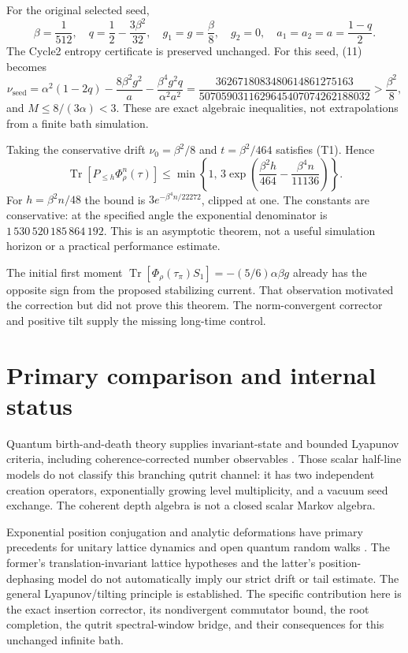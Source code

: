 \documentclass[11pt]{article}
\newcommand{\Tr}{\operatorname{Tr}}
\begin{document}
For the original selected seed,
\[
 \beta=\frac1{512},\quad
 q=\frac12-\frac{3\beta^2}{32},\quad g_1=g=\frac\beta8,\quad
 g_2=0,\quad a_1=a_2=a=\frac{1-q}{2}.
 \tag{16}
\]
The Cycle2 entropy certificate is preserved unchanged.
For this seed, (11) becomes
\[
 \nu_{\mathrm{seed}}=\alpha^2(1-2q)
 -\frac{8\beta^2g^2}{a}
 -\frac{\beta^4g^2q}{\alpha^2a^2}
 =\frac{3626718083480614861275163}
 {5070590311629645407074262188032}
 >\frac{\beta^2}{8},
 \tag{17}
\]
and $M\le8/(3\alpha)<3$. These are exact algebraic inequalities,
not extrapolations from a finite bath simulation.

Taking the conservative drift $\nu_0=\beta^2/8$ and
$t=\beta^2/464$ satisfies (T1). Hence
\[
 \Tr[P_{\le h}\Phi_\rho^n(\tau)]
 \le\min\left\{1,\,
 3\exp\left(\frac{\beta^2h}{464}
               -\frac{\beta^4n}{11136}\right)\right\}.
 \tag{18}
\]
For $h=\beta^2n/48$ the bound is
$3e^{-\beta^4n/22272}$, clipped at one. The constants are conservative:
at the specified angle the exponential denominator is
$1\,530\,520\,185\,864\,192$. This is an asymptotic theorem, not a useful
simulation horizon or a practical performance estimate.

The initial first moment
$\Tr[\Phi_\rho(\tau_\pi)S_1]=-(5/6)\alpha\beta g$
already has the opposite sign from the proposed stabilizing current.
That observation motivated the correction but did not prove this theorem.
The norm-convergent corrector and positive tilt supply the missing
long-time control.



\section{Primary comparison and internal status}

Quantum birth-and-death theory supplies invariant-state and bounded
Lyapunov criteria, including coherence-corrected number observables
\cite{Buecher,BuecherEtAl}. Those scalar half-line models do not classify this
branching qutrit channel: it has two independent creation operators,
exponentially growing level multiplicity, and a vacuum seed exchange.
The coherent depth algebra is not a closed scalar Markov algebra.

Exponential position conjugation and analytic deformations have primary
precedents for unitary lattice dynamics \cite{CedzichEtAl} and open quantum
random walks \cite{CarbonePautrat}. The former's translation-invariant
lattice hypotheses and the latter's position-dephasing model do not
automatically imply our strict drift or tail estimate. The general
Lyapunov/tilting principle is established. The specific contribution here
is the exact insertion corrector, its nondivergent commutator bound,
the root completion, the qutrit spectral-window bridge, and their
consequences for this unchanged infinite bath.
\end{document}
